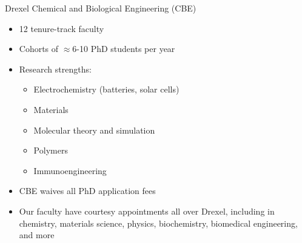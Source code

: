 \begin{frame}[fragile]{Drexel Chemical and Biological Engineering (CBE)}
\begin{itemize}
    \item 12 tenure-track faculty
    \item Cohorts of $\approx$6-10 PhD students per year
    \item Research strengths:
    \begin{itemize}
        \item Electrochemistry (batteries, solar cells)
        \item Materials
        \item Molecular theory and simulation
        \item Polymers
        \item Immunoengineering
    \end{itemize}
    \item CBE waives all PhD application fees
    \item Our faculty have courtesy appointments all over Drexel, including in chemistry, materials science, physics, biochemistry, biomedical engineering, and more
\end{itemize}
\end{frame}

